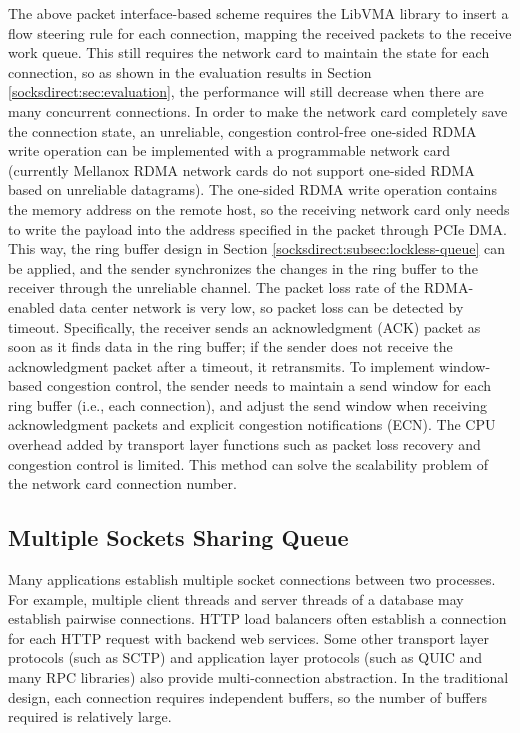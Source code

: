 The above packet interface-based scheme requires the LibVMA library to insert a flow steering rule for each connection, mapping the received packets to the receive work queue. This still requires the network card to maintain the state for each connection, so as shown in the evaluation results in Section \ref{socksdirect:sec:evaluation}, the performance will still decrease when there are many concurrent connections. In order to make the network card completely save the connection state, an unreliable, congestion control-free one-sided RDMA write operation can be implemented with a programmable network card (currently Mellanox RDMA network cards do not support one-sided RDMA based on unreliable datagrams). The one-sided RDMA write operation contains the memory address on the remote host, so the receiving network card only needs to write the payload into the address specified in the packet through PCIe DMA. This way, the ring buffer design in Section \ref{socksdirect:subsec:lockless-queue} can be applied, and the sender synchronizes the changes in the ring buffer to the receiver through the unreliable channel. The packet loss rate of the RDMA-enabled data center network is very low, so packet loss can be detected by timeout. Specifically, the receiver sends an acknowledgment (ACK) packet as soon as it finds data in the ring buffer; if the sender does not receive the acknowledgment packet after a timeout, it retransmits. To implement window-based congestion control, the sender needs to maintain a send window for each ring buffer (i.e., each connection), and adjust the send window when receiving acknowledgment packets and explicit congestion notifications (ECN). The CPU overhead added by transport layer functions such as packet loss recovery and congestion control is limited. This method can solve the scalability problem of the network card connection number.

\subsection{Multiple Sockets Sharing Queue}
\label{socksdirect:subsec:multiplex-conn}

Many applications establish multiple socket connections between two processes. For example, multiple client threads and server threads of a database may establish pairwise connections. HTTP load balancers often establish a connection for each HTTP request with backend web services. Some other transport layer protocols (such as SCTP) and application layer protocols (such as QUIC and many RPC libraries) also provide multi-connection abstraction. In the traditional design, each connection requires independent buffers, so the number of buffers required is relatively large.

